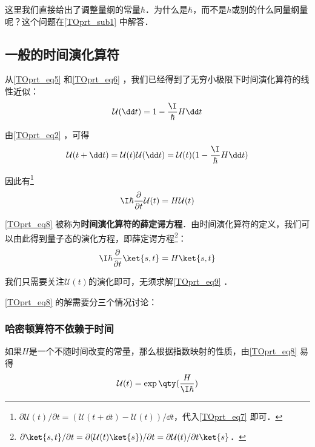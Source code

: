 这里我们直接给出了调整量纲的常量$\hbar$．为什么是$\hbar$，而不是$h$或别的什么同量纲量呢？这个问题在\autoref{TOprt_sub1} 中解答．



\subsection{一般的时间演化算符}

从\autoref{TOprt_eq5} 和\autoref{TOprt_eq6} ，我们已经得到了无穷小极限下时间演化算符的线性近似：
\begin{equation}
\mathcal{U}(\dd t)=1-\frac{\I}{\hbar}H \dd t
\end{equation}

由\autoref{TOprt_eq2} ，可得
\begin{equation}\label{TOprt_eq7}
\mathcal{U}(t+\dd t) = \mathcal{U}(t)\mathcal{U}(\dd t) = \mathcal{U}(t)(1-\frac{\I}{\hbar}H \dd t)
\end{equation}

因此有\footnote{$\partial\mathcal{U}(t)/\partial t=(\mathcal{U}(t+\dd t)-\mathcal{U}(t))/\dd t$，代入\autoref{TOprt_eq7} 即可．}
\begin{equation}\label{TOprt_eq8}
\I\hbar\frac{\partial}{\partial t}\mathcal{U}(t) = H\mathcal{U}(t)
\end{equation}


\autoref{TOprt_eq8} 被称为\textbf{时间演化算符的薛定谔方程}．由时间演化算符的定义，我们可以由此得到量子态的演化方程，即薛定谔方程\footnote{$\partial\ket{s, t}/\partial t=\partial(\mathcal{U}(t)\ket{s})/\partial t=\partial \mathcal{U}(t)/\partial t \ket{s}$．}：
\begin{equation}\label{TOprt_eq9}
\I\hbar\frac{\partial}{\partial t}\ket{s, t} = H\ket{s, t}
\end{equation}


我们只需要关注$\mathcal{U}(t)$的演化即可，无须求解\autoref{TOprt_eq9} ．

\autoref{TOprt_eq8} 的解需要分三个情况讨论：


\subsubsection{哈密顿算符不依赖于时间}

如果$H$是一个不随时间改变的常量，那么根据指数映射的性质，由\autoref{TOprt_eq8} 易得
\begin{equation}
\mathcal{U}(t) = \exp\qty(\frac{H}{\I \hbar})
\end{equation}

